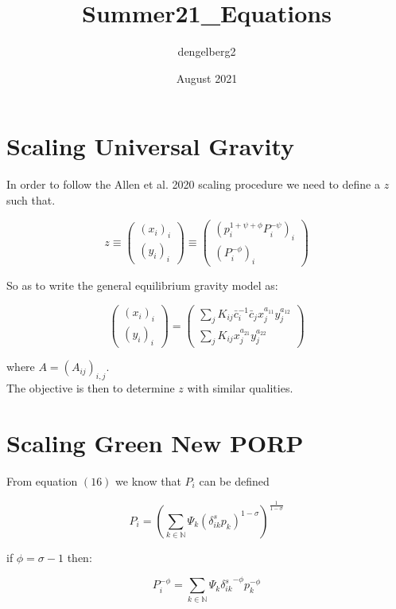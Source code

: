 \documentclass{article}
\title{Summer21_Equations}
\author{dengelberg2 }
\date{August 2021}
\begin{document}
\section{Scaling Universal Gravity}

In order to follow the Allen et al. 2020 scaling procedure we need to define a $z$ such that.


\begin{equation*}
z \equiv
\begin{pmatrix} (x_i)_i \\[8pt] (y_i)_i \end{pmatrix}
\equiv
\begin{pmatrix} (p_i^{1 + \psi + \phi} P_i^{-\psi})_i \\[8pt] (P_i^{-\phi})_i \end{pmatrix}
\end{equation*}

So as to write the general equilibrium gravity model as:

\begin{equation*}
\begin{pmatrix} (x_i)_i \\[8pt] (y_i)_i \end{pmatrix}
=
\begin{pmatrix} \sum_j K_{ij} \bar{c}_i^{-1} \bar{c}_j x_j^{a_{11}} y_j^{a_{12}} \\[8pt] 
\sum_j K_{ij} x_j^{a_{21}} y_j^{a_{22}}
\end{pmatrix}
\end{equation*}

where $A = (A_{ij})_{i,j}$.\\

The objective is then to determine $z$ with similar qualities.



\section{Scaling Green New PORP}

From equation $(16)$ we know that $P_i$ can be defined 

\begin{equation*}
P_i = \left( \sum_{k\in \mathbb{N}}  \Psi_k \left(\delta_{ik}^s p_{k}\right)^{1-\sigma} \right)^{\frac{1}{1-\sigma}}
\end{equation*}

if $\phi = \sigma - 1$ then:

\begin{equation*}
P_i^{-\phi} = \sum_{k\in \mathbb{N}}  \Psi_k {\delta_{ik}^s}^{-\phi} p_{k}^{-\phi}
\end{equation*}
\end{document}
